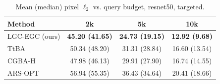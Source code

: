 \begin{table}[t]
\centering\footnotesize
\caption{Mean (median) pixel $\ell_2$ vs. query budget, resnet50, targeted.}
\begin{tabular}{lccc}
\toprule
Method & 2k & 5k & 10k \\
\midrule
LGC-EGC (ours) & \textbf{45.20 (41.65)} & \textbf{24.73 (19.15)} & \textbf{12.92 (9.68)} \\
TtBA & 50.34 (48.20) & 31.31 (28.84) & 16.60 (13.54) \\
CGBA-H & 47.98 (46.13) & 29.91 (27.90) & 16.74 (14.55) \\
ARS-OPT & 56.94 (55.35) & 36.43 (34.64) & 20.41 (18.66) \\
\bottomrule
\end{tabular}
\end{table}

